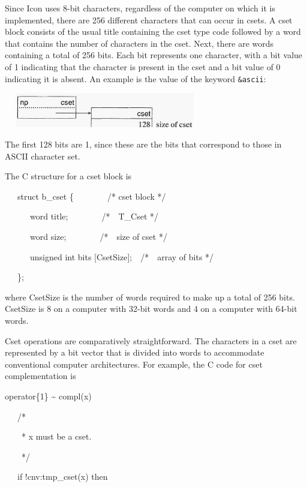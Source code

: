 Since Icon uses 8-bit characters, regardless of the computer on which
it is implemented, there are 256 different characters that can occur
in csets. A cset block consists of the usual title containing the cset
type code followed by a word that contains the number of characters in
the cset. Next, there are words containing a total of 256 bits. Each
bit represents one character, with a bit value of 1 indicating that
the character is present in the cset and a bit value of 0 indicating
it is absent. An example is the value of the keyword \texttt{\&ascii}:


\ \  \includegraphics[width=3.2063in,height=0.5965in]{ib-img/ib-img026.jpg} 


The first 128 bits are 1, since these are the bits that correspond to
those in ASCII character set.

The C structure for a cset block is

{\ttfamily\mdseries
\ \ \ struct b\_cset \{\ \ \ \ \ \ \ \ /* cset block */}

{\ttfamily\mdseries
\ \ \ \ \ \ word title;\ \ \ \ \ \ \ \ /*\ \ T\_Cset */}

{\ttfamily\mdseries
\ \ \ \ \ \ word size;\ \ \ \ \ \ \ \ /*\ \ size of cset */}

{\ttfamily\mdseries
\ \ \ \ \ \ unsigned int bits [CsetSize];\ \ /*\ \ array of bits */}

{\ttfamily\mdseries
\ \ \ \};}

\noindent where CsetSize is the number of words required to make up a
total of 256 bits. CsetSize is 8 on a computer with 32-bit words and 4
on a computer with 64-bit words.

Cset operations are comparatively straightforward. The characters in a
cset are represented by a bit vector that is divided into words to
accommodate conventional computer architectures. For example, the C
code for cset complementation is

{\ttfamily\mdseries
operator\{1\} \~{} compl(x)}

{\ttfamily\mdseries
\ \ \ /*}

{\ttfamily\mdseries
\ \ \ \ * x must be a cset.}

{\ttfamily\mdseries
\ \ \ \ */}

{\ttfamily\mdseries
\ \ \ if !cnv:tmp\_cset(x) then}

